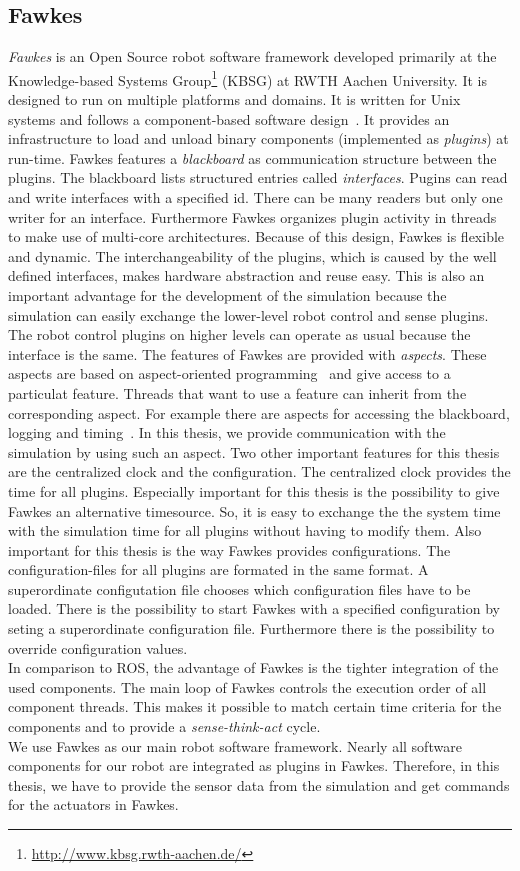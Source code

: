 \subsection{Fawkes}
\textit{Fawkes} is an Open Source robot software framework developed primarily at the Knowledge-based Systems Group\footnote{\url{http://www.kbsg.rwth-aachen.de/}} (KBSG) at RWTH Aachen University. It is designed to run on multiple platforms and domains. It is written for Unix systems and follows a component-based software design~\cite{FawkesDesign}. It provides an infrastructure to load and unload binary components (implemented as \textit{plugins}) at run-time. Fawkes features a \textit{blackboard} as communication structure between the plugins. The blackboard lists structured entries called \textit{interfaces}. Pugins can read and write interfaces with a specified id. There can be many readers but only one writer for an interface. Furthermore Fawkes organizes plugin activity in threads to make use of multi-core architectures. Because of this design, Fawkes is flexible and dynamic. The interchangeability of the plugins, which is caused by the well defined interfaces, makes hardware abstraction and reuse easy. This is also an important advantage for the development of the simulation because the simulation can easily exchange the lower-level robot control and sense plugins. The robot control plugins on higher levels can operate as usual because the interface is the same. The features of Fawkes are provided with \textit{aspects}. These aspects are based on aspect-oriented programming~\cite{aspect_oriented} and give access to a particulat feature. Threads that want to use a feature can inherit from the corresponding aspect. For example there are aspects for accessing the blackboard, logging and timing~\cite{tnthesis}. In this thesis, we provide communication with the simulation by using such an aspect. Two other important features for this thesis are the centralized clock and the configuration. The centralized clock provides the time for all plugins. Especially important for this thesis is the possibility to give Fawkes an alternative timesource. So, it is easy to exchange the the system time with the simulation time for all plugins without having to modify them. Also important for this thesis is the way Fawkes provides configurations. The configuration-files for all plugins are formated in the same format. A superordinate configutation file chooses which configuration files have to be loaded. There is the possibility to start Fawkes with a specified configuration by seting a superordinate configuration file. Furthermore there is the possibility to override configuration values.\\
In comparison to ROS, the advantage of Fawkes is the tighter integration of the used components. The main loop of Fawkes controls the execution order of all component threads. This makes it possible to match certain time criteria for the components and to provide a \textit{sense-think-act} cycle.\\
We use Fawkes as our main robot software framework. Nearly all software components for our robot are integrated as plugins in Fawkes. Therefore, in this thesis, we have to provide the sensor data from the simulation and get commands for the actuators in Fawkes.

